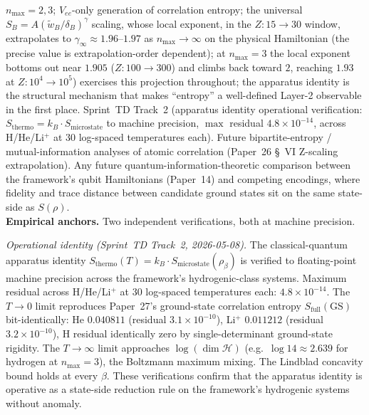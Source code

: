 \documentclass[11pt]{article}
\begin{document}
$n_{\max}=2,3$; $V_{ee}$-only generation of correlation entropy; the
universal $S_B = A(\tilde{w}_B/\delta_B)^\gamma$ scaling, whose local
exponent, in the $Z:15\to30$ window, extrapolates to
$\gamma_\infty \approx 1.96$--$1.97$ as $n_{\max} \to \infty$ on the
physical Hamiltonian (the precise value is extrapolation-order
dependent); at $n_{\max}=3$ the
local exponent bottoms out near $1.905$ ($Z:100\to300$) and climbs back
toward $2$, reaching $1.93$ at $Z:10^4\to10^5$)
exercises this projection throughout; the apparatus identity is the
structural mechanism that makes ``entropy'' a well-defined Layer-2
observable in the first place.  Sprint~TD Track~2 (apparatus identity
operational verification: $S_\mathrm{thermo} = k_B \cdot
S_\mathrm{microstate}$ to machine precision, $\max$ residual
$4.8\times 10^{-14}$, across H/He/Li$^+$ at $30$ log-spaced
temperatures each).  Future bipartite-entropy / mutual-information
analyses of atomic correlation (Paper~26 \S~VI Z-scaling
extrapolation).  Any future quantum-information-theoretic comparison
between the framework's qubit Hamiltonians (Paper~14) and competing
encodings, where fidelity and trace distance between candidate ground
states sit on the same state-side as $S(\rho)$.\\
\textbf{Empirical anchors.}  Two independent verifications, both at
machine precision.
\smallskip

\textit{Operational identity (Sprint~TD Track~2, 2026-05-08).}  The
classical-quantum apparatus identity $S_\mathrm{thermo}(T) = k_B \cdot
S_\mathrm{microstate}(\rho_\beta)$ is verified to floating-point
machine precision across the framework's hydrogenic-class systems.
Maximum residual across H/He/Li$^+$ at $30$ log-spaced temperatures
each: $4.8 \times 10^{-14}$.  The $T \to 0$ limit reproduces
Paper~27's ground-state correlation entropy $S_\mathrm{full}(\mathrm{GS})$
bit-identically: He $0.040811$ (residual $3.1\times 10^{-10}$),
Li$^+$ $0.011212$ (residual $3.2\times 10^{-10}$), H residual
identically zero by single-determinant ground-state rigidity.  The
$T \to \infty$ limit approaches $\log(\dim \mathcal{H})$ (e.g.\ $\log
14 \approx 2.639$ for hydrogen at $n_{\max}=3$), the Boltzmann maximum
mixing.  The Lindblad concavity bound holds at every $\beta$.  These
verifications confirm that the apparatus identity is operative as a
state-side reduction rule on the framework's hydrogenic systems
without anomaly.
\smallskip
\end{document}
